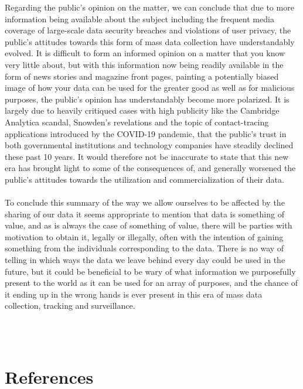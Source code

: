 \documentclass[11pt]{article}
\begin{document}
Regarding the public’s opinion on the matter, we can conclude that due to more information being available about the subject including the frequent media coverage of large-scale data security breaches and violations of user privacy, the public’s attitudes towards this form of mass data collection have understandably evolved. It is difficult to form an informed opinion on a matter that you know very little about, but with this information now being readily available in the form of news stories and magazine front pages, painting a potentially biased image of how your data can be used for the greater good as well as for malicious purposes, the public’s opinion has understandably become more polarized. It is largely due to heavily critiqued cases with high publicity like the Cambridge Analytica scandal, Snowden’s revelations and the topic of contact-tracing applications introduced by the COVID-19 pandemic, that the public’s trust in both governmental institutions and technology companies have steadily declined these past 10 years. It would therefore not be inaccurate to state that this new era has brought light to some of the consequences of, and generally worsened the public’s attitudes towards the utilization and commercialization of their data.
\\ \\
To conclude this summary of the way we allow ourselves to be affected by the sharing of our data it seems appropriate to mention that data is something of value, and as is always the case of something of value, there will be parties with motivation to obtain it, legally or illegally, often with the intention of gaining something from the individuals corresponding to the data. There is no way of telling in which ways the data we leave behind every day could be used in the future, but it could be beneficial to be wary of what information we purposefully present to the world as it can be used for an array of purposes, and the chance of it ending up in the wrong hands is ever present in this era of mass data collection, tracking and surveillance.

\\ \\

\section{References}
\end{document}
